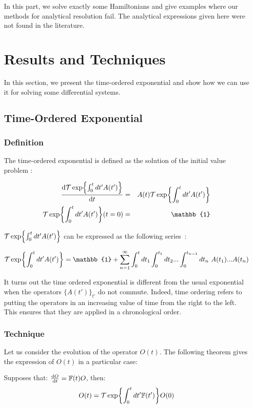 In this part, we solve exactly some Hamiltonians and give examples where our methods for analytical resolution fail. The analytical expressions given here were not found in the literature.

\section{Results and Techniques}
In this section, we present the time-ordered exponential and show how we can use it for solving some differential systems.

\subsection{Time-Ordered Exponential}
\subsubsection{Definition}
The time-ordered exponential is defined as the solution of the initial value problem \cite{wiki_time_exp, course-time_exp}:

\begin{eqnarray}
    \timeDeriv{\texp{A}} &=& A(t) \texp{A}\\
    \texp{A}(t = 0) &=& \mathbb{1}
\end{eqnarray}

$\mathcal{T}\exp{\int_{0}^t dt' A(t')}$ can be expressed as the following series~\cite{course-time_exp}:

\begin{equation}
    \texp{A} = \mathbb{1} + \sum_{n=1}^\infty \int_{0}^{t} dt_1 \int_{0}^{t_1} dt_2 ... \int_{0}^{t_{n-1}} dt_n \ A(t_1) ... A(t_n)
\end{equation}

It turns out the time ordered exponential is different from the usual exponential when the operators $\{A(t')\}_{t'}$ do not commute. Indeed, time ordering refers to putting the operators in an increasing value of time from the right to the left. This ensures that they are applied in a chronological order.

\subsubsection{Technique}

Let us consider the evolution of the operator $O(t)$. The following theorem gives the expression of $O(t)$ in a particular case:

\begin{theorem} \label{th_res-toe}
    Supposes that: $\dv{O}{t} = \mathbb{F}(t) O$, then:
    \begin{equation}
        O(t) = \mathcal{T}\exp{\int_{0}^t dt' \mathbb{F}(t')} O(0)
    \end{equation}
\end{theorem}

